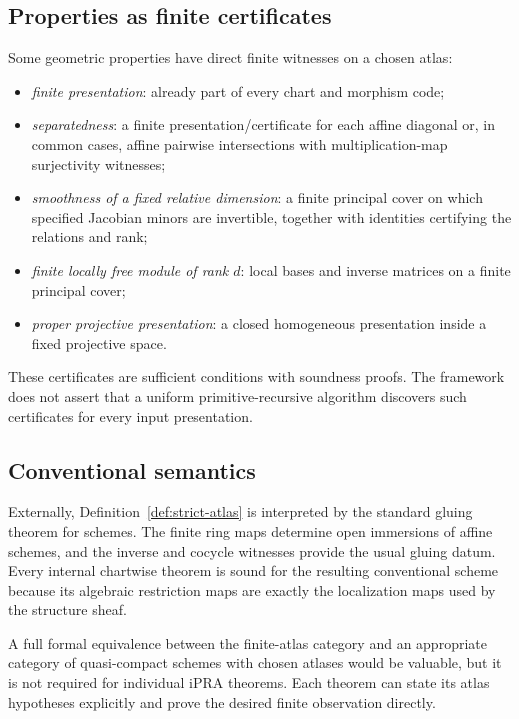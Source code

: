 \subsection{Properties as finite certificates}

Some geometric properties have direct finite witnesses on a chosen atlas:

\begin{itemize}
\item \emph{finite presentation}: already part of every chart and morphism code;
\item \emph{separatedness}: a finite presentation/certificate for each affine diagonal or,
      in common cases, affine pairwise intersections with multiplication-map surjectivity witnesses;
\item \emph{smoothness of a fixed relative dimension}: a finite principal cover on which specified
      Jacobian minors are invertible, together with identities certifying the relations and rank;
\item \emph{finite locally free module of rank $d$}: local bases and inverse matrices on a finite
      principal cover;
\item \emph{proper projective presentation}: a closed homogeneous presentation inside a fixed
      projective space.
\end{itemize}

These certificates are sufficient conditions with soundness proofs.  The framework does not assert
that a uniform primitive-recursive algorithm discovers such certificates for every input
presentation.

\subsection{Conventional semantics}

Externally, Definition~\ref{def:strict-atlas} is interpreted by the standard gluing theorem for
schemes.  The finite ring maps determine open immersions of affine schemes, and the inverse and
cocycle witnesses provide the usual gluing datum.  Every internal chartwise theorem is sound for the
resulting conventional scheme because its algebraic restriction maps are exactly the localization
maps used by the structure sheaf.

A full formal equivalence between the finite-atlas category and an appropriate category of
quasi-compact schemes with chosen atlases would be valuable, but it is not required for individual
iPRA theorems.  Each theorem can state its atlas hypotheses explicitly and prove the desired finite
observation directly.
